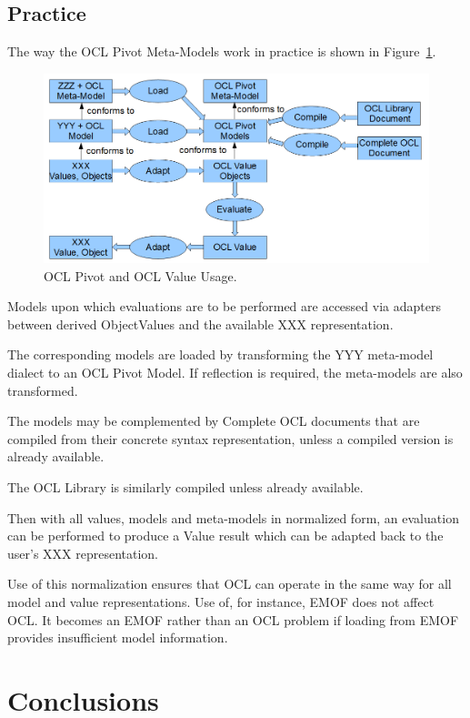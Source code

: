 \documentclass{eceasst}
\begin{document}
\subsection{Practice}

The way the OCL Pivot Meta-Models work in practice is shown in Figure~\ref{fig:Usage}. 

\begin{figure}
  \begin{center}
    \includegraphics[width=5.75in]{Usage.png}
  \end{center}
  \caption{OCL Pivot and OCL Value Usage.}
  \label{fig:Usage}
\end{figure}

Models upon which evaluations are to be performed are accessed via adapters between derived ObjectValues and the available XXX representation.

The corresponding models are loaded by transforming the YYY meta-model dialect to an OCL Pivot Model. If reflection is required, the meta-models are also transformed.

The models may be complemented by Complete OCL documents that are compiled from their concrete syntax representation, unless a compiled version is already available.

The OCL Library is similarly compiled unless already available.

Then with all values, models and meta-models in normalized form, an evaluation can be performed to produce a Value result which can be adapted back to the user's XXX representation.  

Use of this normalization ensures that OCL can operate in the same way for all model and value representations. Use of, for instance, EMOF does not affect OCL. It becomes an EMOF rather than an OCL problem if loading from EMOF provides insufficient model information.

\section{Conclusions}
\end{document}
